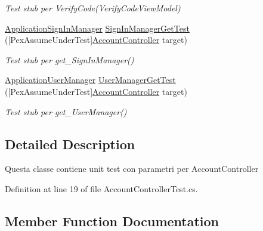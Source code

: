 \begin{DoxyCompactItemize}
\begin{DoxyCompactList}\small\item\em Test stub per Verify\+Code(\+Verify\+Code\+View\+Model)\end{DoxyCompactList}\item 
\mbox{\hyperlink{class_brew_day2_1_1_application_sign_in_manager}{Application\+Sign\+In\+Manager}} \mbox{\hyperlink{class_brew_day2_1_1_tests_1_1_account_controller_test_a1d7b298a4ff46ae60c23f324d5a10e31}{Sign\+In\+Manager\+Get\+Test}} (\mbox{[}Pex\+Assume\+Under\+Test\mbox{]}\mbox{\hyperlink{class_brew_day2_1_1_controllers_1_1_account_controller}{Account\+Controller}} target)
\begin{DoxyCompactList}\small\item\em Test stub per get\+\_\+\+Sign\+In\+Manager()\end{DoxyCompactList}\item 
\mbox{\hyperlink{class_brew_day2_1_1_application_user_manager}{Application\+User\+Manager}} \mbox{\hyperlink{class_brew_day2_1_1_tests_1_1_account_controller_test_ab5f9b6689f2f048ab2e6b83030e99c73}{User\+Manager\+Get\+Test}} (\mbox{[}Pex\+Assume\+Under\+Test\mbox{]}\mbox{\hyperlink{class_brew_day2_1_1_controllers_1_1_account_controller}{Account\+Controller}} target)
\begin{DoxyCompactList}\small\item\em Test stub per get\+\_\+\+User\+Manager()\end{DoxyCompactList}\end{DoxyCompactItemize}


\subsection{Detailed Description}
Questa classe contiene unit test con parametri per Account\+Controller



Definition at line 19 of file Account\+Controller\+Test.\+cs.



\subsection{Member Function Documentation}
\mbox{\label{class_brew_day2_1_1_tests_1_1_account_controller_test_aa905022faa912fd82b84ed93e719f43d}} 
